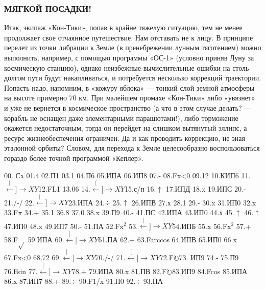 \documentclass[11pt,a4paper,oneside]{article}
\def\XY{$\stackrel[\leftarrow]{\rightarrow}{XY}$}
\def\FO{F$\circlearrowright$}
\begin{document}
\subsubsection{МЯГКОЙ ПОСАДКИ!}
Итак, экипаж «Кон-Тики», попав в крайне тяжелую ситуацию, тем не менее продолжает свое отчаянное путешествие. Нам отставать не к лицу. В принципе перелет из точки либрации к Земле (в пренебрежении лунным тяготением) можно выполнить, например, с помощью программы «ОС-1» (условно приняв Луну за космическую станцию), однако неизбежные вычислительные ошибки на столь долгом пути будут накапливаться, и потребуется несколько коррекций траектории. Попасть надо, напомним, в «кожуру яблока» — тонкий слой земной атмосферы на высоте примерно 70 км. При малейшем промахе «Кон-Тики» либо «увязнет» и уже не вернется в космическое пространство (а что в этом случае делать? — корабль не оснащен даже элементарными парашютами!), либо торможение окажется недостаточным, тогда он перейдет на слишком вытянутый эллипс, а ресурс жизнеобеспечения ограничен. Да и как проводить коррекцию, не зная эталонной орбиты? Словом, для перехода к Земле целесообразно воспользоваться гораздо более точной программой «Кеплер».

00. Сх 01.4 02.П1 03.1 04.П6 05.ИПА 06.ИП8 07.- 08.Fx<0 09.12 10.КИП6 11.\XY 12.FL1 13.06 14.\XY 15.с/п
16.$\uparrow$ 17.ИПД 18.x 19.ИПС 20.- 21./-/ 22.\XY 23.ИПА 24.$\div$ 25.$\uparrow$ 26.ИПВ
27.х 28.1 29.- 30.x 31.ИП0 32.x 33.F$\pi$ 34.$\div$ 35.1 36.8 37.0 38.x 39.П9 40.- 41.ПС 42.ИПА 43.ИП0 44.х 45.$\uparrow$ 46.$\uparrow$ 47.ИП0 48.x 49.ИП7 50.- 51.ПА 52.Fx$^{2}$ 53.\XY 54.ИПБ 55.x 56.Fx$^{2}$ 57.+ 58.F$\sqrt{}$ 59.ИПА 60.\XY 61.ПА 62.$\div$ 63.Farccos 64.ИПВ 65.ИП0 66.x 67.Fx<0 68.72 69.\XY 70./-/ 71.\XY 72.\FO 73. ИП9 74.- 75.П9 76.Fsin 77.\XY 78.$\div$ 79.ИПА 80.x 81.ПВ 82.\FO 83.ИП9 84.Fcos 85.ИПА 86.x 87.ИП7 88.+ 89.$\div$ 90.F1/x 91.П0 92.$\div$ 93.ПА
\end{document}
